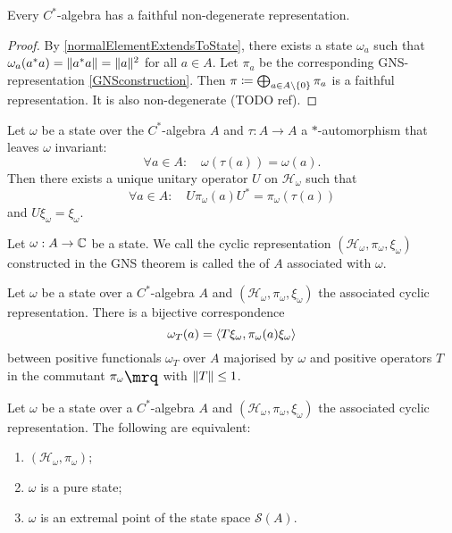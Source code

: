\begin{theorem}
Every $C^*$-algebra has a faithful non-degenerate representation.
\end{theorem}
\begin{proof}
By \ref{normalElementExtendsToState}, there exists a state $\omega_a$ such that $\omega_a(a^*a) = \lVert a^*a\rVert = \lVert a\rVert^2$ for all $a\in A$. Let $\pi_a$ be the corresponding GNS-representation \ref{GNSconstruction}. Then $\pi \coloneqq \bigoplus_{a\in A\setminus\{0\}}\pi_a$ is a faithful representation. It is also non-degenerate (TODO ref).
\end{proof}

\begin{proposition}
Let $\omega$ be a state over the $C^*$-algebra $A$ and $\tau: A\to A$ a $*$-automorphism that leaves $\omega$ invariant:
\[ \forall a\in A: \quad \omega(\tau(a)) = \omega(a). \]
Then there exists a unique unitary operator $U$ on $\mathcal{H}_\omega$ such that
\[ \forall a\in A: \quad U\pi_\omega(a)U^* = \pi_\omega(\tau(a)) \]
and $U\xi_\omega = \xi_\omega$.
\end{proposition}

\begin{definition}
Let $\omega: A\to \mathbb{C}$ be a state.
We call the cyclic representation $(\mathcal{H}_\omega,\pi_\omega,\xi_\omega)$ constructed in the GNS theorem is called the  of $A$ associated with $\omega$.
\end{definition}

\begin{lemma}
Let $\omega$ be a state over a $C^*$-algebra $A$ and $(\mathcal{H}_\omega,\pi_\omega,\xi_\omega)$ the associated cyclic representation. There is a bijective correspondence 
\[ \omega_T(a) = \inner{T\xi_\omega, \pi_\omega(a)\xi_\omega} \]
between positive functionals $\omega_T$ over $A$ majorised by $\omega$ and positive operators $T$ in the commutant $\comm{\pi_\omega}$ with $\lVert T\rVert\leq 1$.
\end{lemma}

\begin{proposition}
Let $\omega$ be a state over a $C^*$-algebra $A$ and $(\mathcal{H}_\omega,\pi_\omega,\xi_\omega)$ the associated cyclic representation. The following are equivalent:
\begin{enumerate}
\item $(\mathcal{H}_\omega,\pi_\omega)$;
\item $\omega$ is a pure state;
\item $\omega$ is an extremal point of the state space $\mathcal{S}(A)$.
\end{enumerate}
\end{proposition}

